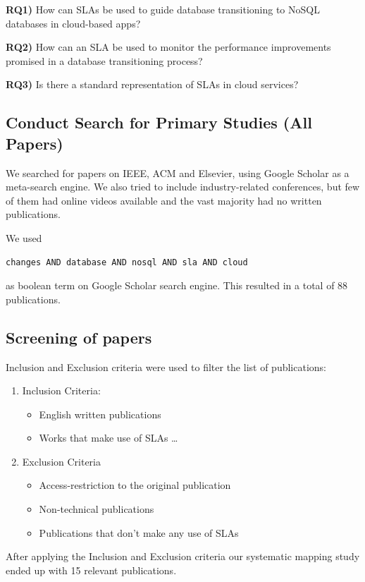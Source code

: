 \documentclass{article}
\begin{document}
\textbf{RQ1)}  How can SLAs be used to guide database transitioning to NoSQL databases in cloud-based apps? 

\textbf{RQ2)} How can an SLA be used to monitor the performance improvements promised in a database transitioning process?

\textbf{RQ3)} Is there a standard representation of SLAs in cloud services? 

\subsection{Conduct Search for Primary Studies (All Papers)}

We searched for papers on IEEE, ACM and Elsevier, using Google Scholar as a meta-search engine. We also tried to include industry-related conferences, but few of them had online videos available and the vast majority had no written publications.

We used \begin{verbatim}changes AND database AND nosql AND sla AND cloud\end{verbatim} as boolean term on Google Scholar search engine. This resulted in a total of 88 publications.


\subsection{Screening of papers}
Inclusion and Exclusion criteria were used to filter the list of publications:

\begin{enumerate}
    \item Inclusion Criteria: 
    \begin{itemize}
  		\item English written publications
  		\item Works that make use of SLAs \ldots
    \end{itemize}
    \item Exclusion Criteria
	\begin{itemize}
		\item Access-restriction to the original publication
		\item Non-technical publications 
		\item Publications that don't make any use of SLAs	
    \end{itemize}
    
\end{enumerate}

After applying the Inclusion and Exclusion criteria our systematic mapping study ended up with 15 relevant publications.
\end{document}
